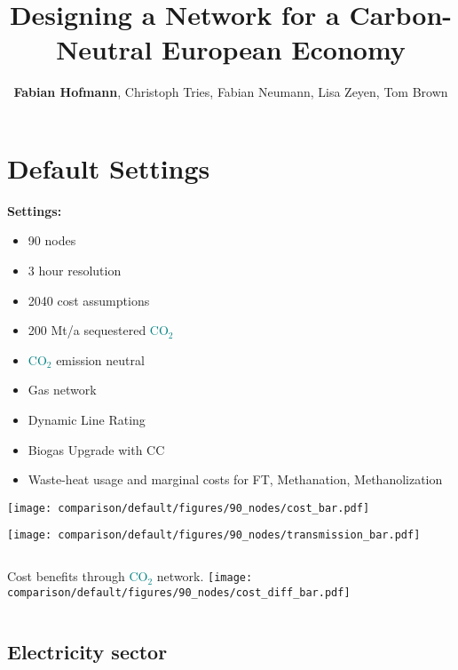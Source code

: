\documentclass[12pt, aspectratio=169]{beamer}
\title{Designing a \carbon{} Network for a Carbon-Neutral European Economy}
\author{\textbf{Fabian Hofmann}, Christoph Tries, Fabian Neumann, Lisa Zeyen, Tom Brown}
\institute{Technical University Berlin}
\date{}
\newcommand{\carbon}{\textcolor{teal}{CO$_2$}}
\begin{document}
\begin{frame}[plain]
    \titlepage
\end{frame}


\section*{Default Settings}

\begin{frame}
    \textbf{Settings:}
    \begin{itemize}
        \item 90 nodes
        \item 3 hour resolution
        \item 2040 cost assumptions
        \item 200 Mt/a sequestered \carbon{}
        \item \carbon{} emission neutral
        \item Gas network
        \item Dynamic Line Rating
        \item Biogas Upgrade with CC
        \item Waste-heat usage and marginal costs for FT, Methanation, Methanolization
    \end{itemize}
\end{frame}

\begin{frame}
        \texttt{[image: comparison/default/figures/90\_nodes/cost\_bar.pdf]}
\end{frame}

\begin{frame}
    \texttt{[image: comparison/default/figures/90\_nodes/transmission\_bar.pdf]}
\end{frame}


\begin{frame}
    \begin{columns}
        Cost benefits through \carbon{} network.
        \texttt{[image: comparison/default/figures/90\_nodes/cost\_diff\_bar.pdf]}
    \end{columns}
\end{frame}


\subsection*{Electricity sector}
\end{document}
